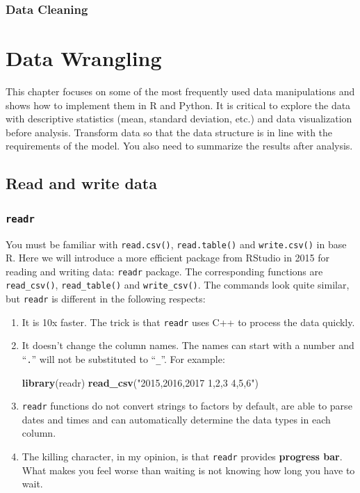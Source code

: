 \documentclass[12pt,]{krantz}
\makeatletter
\newenvironment{Shaded}{\begin{snugshade}}{\end{snugshade}}
\newcommand{\KeywordTok}[1]{\textcolor[rgb]{0.27,0.27,0.27}{\textbf{#1}}}
\newcommand{\StringTok}[1]{\textcolor[rgb]{0.5,0.5,0.5}{#1}}
\newcommand{\NormalTok}[1]{#1}
\newenvironment{kframe}{%
\medskip{}
\setlength{\fboxsep}{.8em}
 \def\at@end@of@kframe{}%
 \ifinner\ifhmode%
  \def\at@end@of@kframe{\end{minipage}}%
  \begin{minipage}{\columnwidth}%
 \fi\fi%
 \def\FrameCommand##1{\hskip\@totalleftmargin \hskip-\fboxsep
 \colorbox{shadecolor}{##1}\hskip-\fboxsep
     \hskip-\linewidth \hskip-\@totalleftmargin \hskip\columnwidth}%
 \MakeFramed {\advance\hsize-\width
   \@totalleftmargin\z@ \linewidth\hsize
   \@setminipage}}%
 {\par\unskip\endMakeFramed%
 \at@end@of@kframe}
\renewenvironment{Shaded}{\begin{kframe}}{\end{kframe}}
\theoremstyle{definition}
\theoremstyle{definition}
\theoremstyle{definition}
\theoremstyle{remark}
\makeatother
\begin{document}
\subsection{Data Cleaning}\label{data-cleaning-1}

\chapter{Data Wrangling}\label{data-wrangling}

This chapter focuses on some of the most frequently used data
manipulations and shows how to implement them in R and Python. It is
critical to explore the data with descriptive statistics (mean, standard
deviation, etc.) and data visualization before analysis. Transform data
so that the data structure is in line with the requirements of the
model. You also need to summarize the results after analysis.

\section{Read and write data}\label{read-and-write-data}

\subsection{\texorpdfstring{\texttt{readr}}{readr}}\label{readr}

You must be familiar with \texttt{read.csv()}, \texttt{read.table()} and
\texttt{write.csv()} in base R. Here we will introduce a more efficient
package from RStudio in 2015 for reading and writing data:
\texttt{readr} package. The corresponding functions are
\texttt{read\_csv()}, \texttt{read\_table()} and \texttt{write\_csv()}.
The commands look quite similar, but \texttt{readr} is different in the
following respects:

\begin{enumerate}
\def\labelenumi{\arabic{enumi}.}
\item
  It is 10x faster. The trick is that \texttt{readr} uses C++ to process
  the data quickly.
\item
  It doesn't change the column names. The names can start with a number
  and ``\texttt{.}'' will not be substituted to ``\texttt{\_}''. For
  example:

\begin{Shaded}
\begin{Highlighting}[]
\KeywordTok{library}\NormalTok{(readr)}
\KeywordTok{read_csv}\NormalTok{(}\StringTok{"2015,2016,2017}
\StringTok{1,2,3}
\StringTok{4,5,6"}\NormalTok{)}
\end{Highlighting}
\end{Shaded}
\item
  \texttt{readr} functions do not convert strings to factors by default,
  are able to parse dates and times and can automatically determine the
  data types in each column.
\item
  The killing character, in my opinion, is that \texttt{readr} provides
  \textbf{progress bar}. What makes you feel worse than waiting is not
  knowing how long you have to wait.
\end{enumerate}
\end{document}
